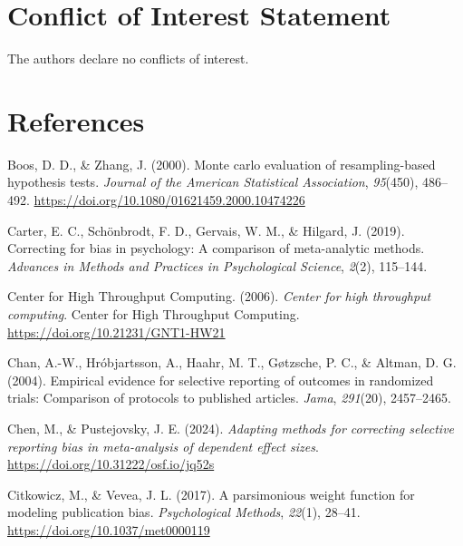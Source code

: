 \documentclass[
  american,
  man, donotrepeattitle,floatsintext]{apa7}
\newlength{\cslhangindent}
\newenvironment{CSLReferences}[2] %
 {\begin{list}{}{%
  \setlength{\itemindent}{0pt}
  \setlength{\leftmargin}{0pt}
  \setlength{\parsep}{0pt}
  \ifodd #1
   \setlength{\leftmargin}{\cslhangindent}
   \setlength{\itemindent}{-1\cslhangindent}
  \fi
  \setlength{\itemsep}{#2\baselineskip}}}
 {\end{list}}
\begin{document}
\section*{Conflict of Interest Statement}\label{conflict-of-interest-statement}

The authors declare no conflicts of interest.

\section*{References}\label{references}

\begingroup

\protect{}\label{refs}
\begin{CSLReferences}{1}{0}
Boos, D. D., \& Zhang, J. (2000). Monte carlo evaluation of resampling-based hypothesis tests. \emph{Journal of the American Statistical Association}, \emph{95}(450), 486--492. \url{https://doi.org/10.1080/01621459.2000.10474226}

Carter, E. C., Schönbrodt, F. D., Gervais, W. M., \& Hilgard, J. (2019). Correcting for bias in psychology: A comparison of meta-analytic methods. \emph{Advances in Methods and Practices in Psychological Science}, \emph{2}(2), 115--144.

Center for High Throughput Computing. (2006). \emph{Center for high throughput computing}. Center for High Throughput Computing. \url{https://doi.org/10.21231/GNT1-HW21}

Chan, A.-W., Hróbjartsson, A., Haahr, M. T., Gøtzsche, P. C., \& Altman, D. G. (2004). Empirical evidence for selective reporting of outcomes in randomized trials: Comparison of protocols to published articles. \emph{Jama}, \emph{291}(20), 2457--2465.

Chen, M., \& Pustejovsky, J. E. (2024). \emph{Adapting methods for correcting selective reporting bias in meta-analysis of dependent effect sizes}. \url{https://doi.org/10.31222/osf.io/jq52s}

Citkowicz, M., \& Vevea, J. L. (2017). {A parsimonious weight function for modeling publication bias}. \emph{Psychological Methods}, \emph{22}(1), 28--41. \url{https://doi.org/10.1037/met0000119}


\end{CSLReferences}
\end{document}
